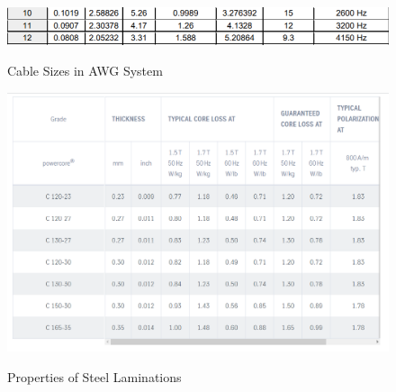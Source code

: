 \begin{figure}[H]
\hspace{1.5cm}
\centering\includegraphics[width=4.5in]{awg.PNG}\\
\caption{Cable Sizes in AWG System}
\label{awg}
\end{figure}

\begin{figure}[H]
\hspace{1.5cm}
\centering\includegraphics[width=4.5in]{steel_prop.PNG}\\
\caption{Properties of Steel Laminations}
\label{steel}
\end{figure} 
 
